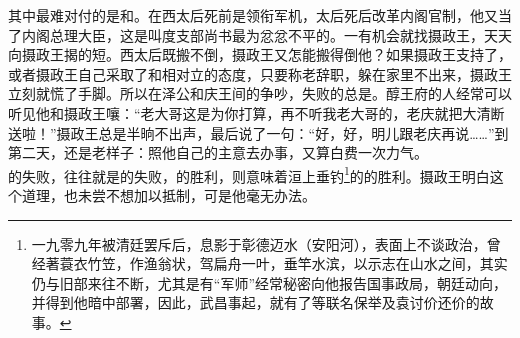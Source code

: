 其中最难对付的是和。在西太后死前是领衔军机，太后死后改革内阁官制，他又当了内阁总理大臣，这是叫度支部尚书最为忿忿不平的。一有机会就找摄政王，天天向摄政王揭的短。西太后既搬不倒，摄政王又怎能搬得倒他？如果摄政王支持了，或者摄政王自己采取了和相对立的态度，只要称老辞职，躲在家里不出来，摄政王立刻就慌了手脚。所以在泽公和庆王间的争吵，失败的总是。醇王府的人经常可以听见他和摄政王嚷：“老大哥这是为你打算，再不听我老大哥的，老庆就把大清断送啦！”摄政王总是半晌不出声，最后说了一句：“好，好，明儿跟老庆再说……”到第二天，还是老样子：照他自己的主意去办事，又算白费一次力气。\\

的失败，往往就是的失败，的胜利，则意味着洹上垂钓\footnote{一九零九年被清廷罢斥后，息影于彰德迈水（安阳河），表面上不谈政治，曾经著蓑衣竹笠，作渔翁状，驾扁舟一叶，垂竿水滨，以示志在山水之间，其实仍与旧部来往不断，尤其是有“军师”经常秘密向他报告国事政局，朝廷动向，并得到他暗中部署，因此，武昌事起，就有了等联名保举及袁讨价还价的故事。}的的胜利。摄政王明白这个道理，也未尝不想加以抵制，可是他毫无办法。\\

